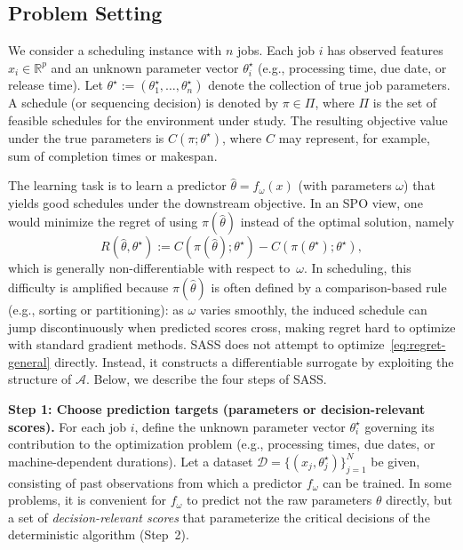 \documentclass{article}
\begin{document}
\subsection{Problem Setting}

We consider a scheduling instance with $n$ jobs.
Each job $i$ has observed features $x_i \in \mathbb{R}^p$ and an unknown
parameter vector $\theta_i^\star$ (e.g., processing time, due date, or release
time).
Let $\theta^\star := (\theta_1^\star,\dots,\theta_n^\star)$ denote the
collection of true job parameters.
A schedule (or sequencing decision) is denoted by $\pi \in \Pi$, where $\Pi$
is the set of feasible schedules for the environment under study.
The resulting objective value under the true parameters is $C(\pi;\theta^\star)$,
where $C$ may represent, for example, sum of completion times or makespan.

The learning task is to learn a predictor $\hat{\theta}=f_\omega(x)$ (with
parameters $\omega$) that yields good schedules under the downstream objective.
In an SPO view, one would minimize the regret of using $\pi(\hat{\theta})$ instead of the
optimal solution, namely
\begin{equation}
\label{eq:regret-general}
R(\hat{\theta},\theta^\star)
:=
C(\pi(\hat{\theta});\theta^\star)
-
C(\pi(\theta^\star);\theta^\star),
\end{equation}
which is generally non-differentiable with respect to~$\omega$.
In scheduling, this difficulty is amplified because $\pi(\hat{\theta})$ is often defined by a comparison-based rule (e.g., sorting or partitioning): as $\omega$ varies smoothly, the induced schedule can jump discontinuously when predicted scores cross, making regret hard to optimize with standard gradient methods.
SASS does not attempt to optimize~\eqref{eq:regret-general} directly.
Instead, it constructs a differentiable surrogate by exploiting the structure of $\mathcal{A}$.
Below, we describe the four steps of SASS.

\noindent\textbf{Step 1: Choose prediction targets (parameters or decision-relevant scores).}
For each job $i$, define the unknown parameter vector $\theta_i^\star$ governing
its contribution to the optimization problem (e.g., processing times, due dates,
or machine-dependent durations).
Let a dataset
$\mathcal{D}=\{(x_j,\theta_j^\star)\}_{j=1}^N$ be given, consisting of past
observations from which a predictor $f_\omega$ can be trained.
In some problems, it is convenient for $f_\omega$ to predict not the raw
parameters $\theta$ directly, but a set of \emph{decision-relevant scores} that
parameterize the critical decisions of the deterministic algorithm (Step~2).
\end{document}
